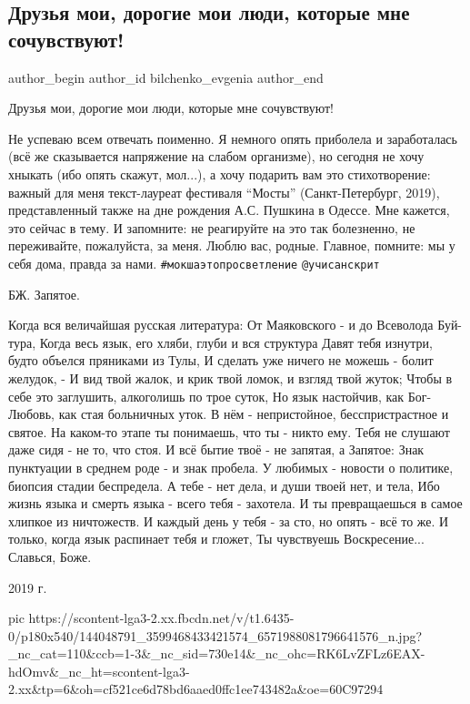  
 
 
 
 
 
\subsection{Друзья мои, дорогие мои  люди, которые мне сочувствуют!}
\label{sec:30_01_2021.fb.bilchenko_evgenia.2.druzja_podderzhka_sochuvstvie}
\ifcmt
 author_begin
   author_id bilchenko_evgenia
 author_end
\fi

Друзья мои, дорогие мои  люди, которые мне сочувствуют! 

Не успеваю всем отвечать поименно. Я немного опять приболела и заработалась
(всё же сказывается напряжение на слабом организме), но сегодня не хочу хныкать
(ибо опять скажут, мол...), а хочу подарить вам это стихотворение: важный для
меня текст-лауреат фестиваля \enquote{Мосты} (Санкт-Петербург, 2019), представленный
также на дне рождения А.С. Пушкина в Одессе. Мне кажется, это сейчас в тему. И
запомните: не реагируйте на это так болезненно, не переживайте, пожалуйста, за
меня. Люблю вас, родные. Главное, помните: мы у себя дома, правда за нами.
\verb|#мокшаэтопросветление| \verb|@учисанскрит|

БЖ. Запятое.

Когда вся величайшая русская литература:
От Маяковского - и до Всеволода Буй-тура,
Когда весь язык, его хляби, глуби и вся структура
Давят тебя изнутри, будто объелся пряниками из Тулы,
И сделать уже ничего не можешь - болит желудок, -
И вид твой жалок, и крик твой ломок, и взгляд твой жуток;
Чтобы в себе это заглушить, алкоголишь по трое суток,
Но язык настойчив, как Бог-Любовь, как стая больничных уток.
В нём - непристойное, бесспристрастное и святое.
На каком-то этапе ты понимаешь, что ты - никто ему.
Тебя не слушают даже сидя - не то, что стоя.
И всё бытие твоё - не запятая, а Запятое:
Знак пунктуации в среднем роде - и знак пробела.
У любимых - новости о политике, биопсия стадии беспредела.
А тебе - нет дела, и души твоей нет, и тела,
Ибо жизнь языка и смерть языка - всего тебя - захотела.
И ты превращаешься в самое хлипкое из ничтожеств. 
И каждый день у тебя - за сто, но опять - всё то же.
И только, когда язык распинает тебя и гложет,
Ты чувствуешь Воскресение...
Славься, Боже.

2019 г.

\ifcmt
  pic https://scontent-lga3-2.xx.fbcdn.net/v/t1.6435-0/p180x540/144048791_3599468433421574_6571988081796641576_n.jpg?_nc_cat=110&ccb=1-3&_nc_sid=730e14&_nc_ohc=RK6LvZFLz6EAX-hdOmv&_nc_ht=scontent-lga3-2.xx&tp=6&oh=cf521ce6d78bd6aaed0ffc1ee743482a&oe=60C97294
\fi

